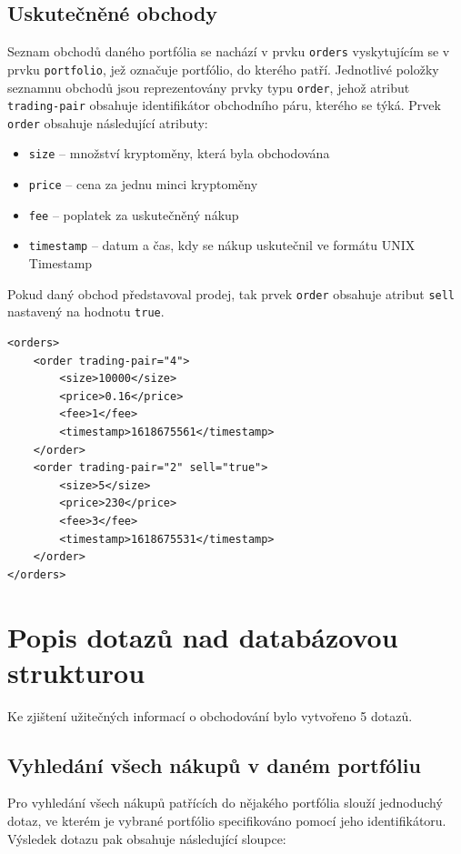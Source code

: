 \documentclass[12pt, a4paper]{article}
\let\oldsection\section
\renewcommand\section{\clearpage\oldsection}
\begin{document}
\subsection{Uskutečněné obchody}
Seznam obchodů daného portfólia se nachází v prvku \texttt{orders} vyskytujícím se v prvku \texttt{portfolio}, jež označuje portfólio, do kterého patří. Jednotlivé položky seznamnu obchodů jsou reprezentovány prvky typu \texttt{order}, jehož atribut \texttt{trading-pair} obsahuje identifikátor obchodního páru, kterého se týká. Prvek \texttt{order} obsahuje následující atributy: 
\begin{itemize}
    \item \texttt{size} -- množství kryptoměny, která byla obchodována
    \item \texttt{price} -- cena za jednu minci kryptoměny
    \item \texttt{fee} -- poplatek za uskutečněný nákup
    \item \texttt{timestamp} -- datum a čas, kdy se nákup uskutečnil ve formátu UNIX Timestamp
\end{itemize}

Pokud daný obchod představoval prodej, tak prvek \texttt{order} obsahuje atribut \texttt{sell} nastavený na hodnotu \texttt{true}.

\begin{lstlisting}
<orders>
    <order trading-pair="4">
        <size>10000</size>
        <price>0.16</price>
        <fee>1</fee>
        <timestamp>1618675561</timestamp>
    </order>
    <order trading-pair="2" sell="true">
        <size>5</size>
        <price>230</price>
        <fee>3</fee>
        <timestamp>1618675531</timestamp>
    </order>
</orders>
\end{lstlisting}

\section{Popis dotazů nad databázovou strukturou}
Ke zjištení užitečných informací o obchodování bylo vytvořeno 5 dotazů.

\subsection{Vyhledání všech nákupů v daném portfóliu}
Pro vyhledání všech nákupů patřících do nějakého portfólia slouží jednoduchý dotaz, ve kterém je vybrané portfólio specifikováno pomocí jeho identifikátoru. Výsledek dotazu pak obsahuje následující sloupce:
\end{document}
